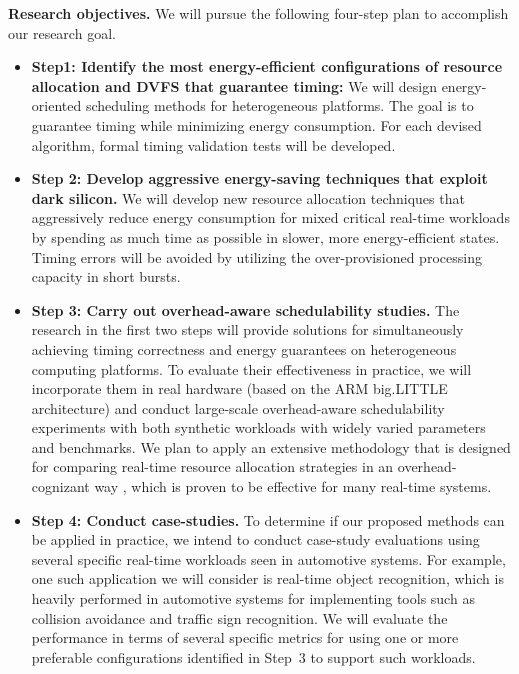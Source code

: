 \vspace{2mm} \noindent \textbf{Research objectives.} We will pursue the following four-step plan to accomplish our research goal.
\begin{itemize}
\item \textbf{Step1: Identify the most energy-efficient configurations of resource allocation and DVFS that guarantee timing:} We will design energy-oriented scheduling methods for heterogeneous platforms. The goal is to guarantee timing while minimizing energy consumption. For each devised algorithm, formal timing validation tests will be developed.  
\item \textbf{Step 2: Develop aggressive energy-saving techniques that exploit dark silicon.} 
We will develop new resource allocation techniques that aggressively reduce energy consumption for mixed critical real-time workloads by spending as much time as possible in slower, more energy-efficient states. Timing errors will be avoided by utilizing the over-provisioned processing capacity in short bursts.
\item \textbf{Step 3: Carry out overhead-aware schedulability studies.} The research in the first two steps will provide solutions for simultaneously achieving timing correctness and energy guarantees on heterogeneous computing platforms. To evaluate their effectiveness in practice, we will incorporate them in real hardware (based on the ARM big.LITTLE architecture) and conduct large-scale overhead-aware schedulability experiments with both synthetic workloads with widely varied parameters and benchmarks. 
 We plan to apply an extensive methodology that is designed for comparing real-time resource allocation strategies in an overhead-cognizant way \cite{clustered, bastoni2010, BBBdissertation}, which is proven to be effective for many real-time systems. 
\item \textbf{Step 4: Conduct case-studies.} To determine if our proposed methods can be applied in practice, we intend to conduct  case-study evaluations using several specific real-time workloads seen in automotive systems. For example, one such application we will consider is real-time object recognition, which is heavily performed in automotive systems for implementing tools such as collision avoidance and traffic sign recognition. We will evaluate the performance in terms of several specific metrics for using one or more preferable configurations identified in Step~3 to support such workloads. 
\end{itemize}


